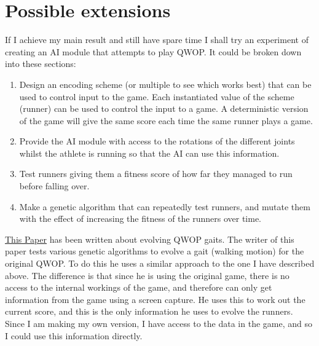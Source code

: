 \documentclass[12pt,a4paper,twoside]{article}
\begin{document}
\section*{Possible extensions}


If I achieve my main result and still have spare time I shall try an experiment of creating an AI module that attempts to play QWOP. It could be broken down into these sections:

\begin{enumerate}
\item Design an encoding scheme (or multiple to see which works best) that can be used to control input to the game. Each instantiated value of the scheme (runner) can be used to control the input to a game. A deterministic version of the game will give the same score each time the same runner plays a game.

\item Provide the AI module with access to the rotations of the different joints whilst the athlete is running so that the AI can use this information.

\item Test runners giving them a fitness score of how far they managed to run before falling over.
  
\item Make a genetic algorithm that can repeatedly test runners, and mutate them with the effect of increasing the fitness of the runners over time.
\end{enumerate}

 


\href{https://dl.acm.org/citation.cfm?id=2598248}{This Paper} \cite{ray2014evolving} has been written about evolving QWOP gaits.
The writer of this paper tests various genetic algorithms to evolve a gait (walking motion) for the original QWOP.
To do this he uses a similar approach to the one I have described above. The difference is that since he is using the original game, there is no access to the internal workings of the game, and therefore can only get information from the game using a screen capture.
He uses this to work out the current score, and this is the only information he uses to evolve the runners. Since I am making my own version, I have access to the data in the game, and so I could use this information directly.
\end{document}
